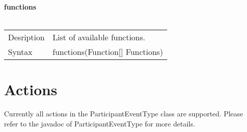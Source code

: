 \documentclass[english,11pt]{article}
\begin{document}
\textbf{functions}\\
\\
\begin{tabularx}{\textwidth}{lX}
 Desription & List of available functions. \\
 Syntax & functions(Function[] Functions) \\
\end{tabularx}
\newline



\section{Actions}

Currently all actions in the ParticipantEventType class are supported. Please refer to the javadoc of ParticipantEventType for more details. 
\end{document}
